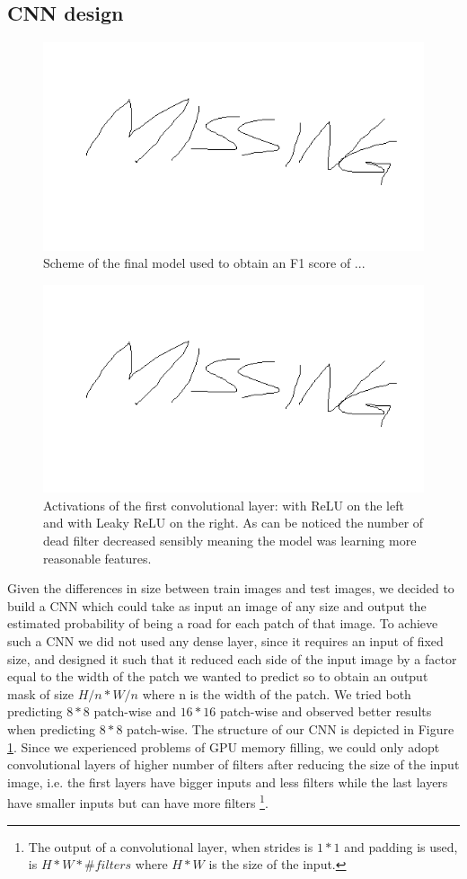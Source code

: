 \documentclass[10pt,conference,compsocconf]{IEEEtran}
\begin{document}
\subsection{CNN design}
\begin{figure}[tbp]
	\centering
	\includegraphics[width=0.8\columnwidth]{img/missing.png}
	\caption{Scheme of the final model used to obtain an F1 score of ... }
	\vspace{-3mm}
	\label{fig:cnn-model}
\end{figure}
\begin{figure}[tbp]
	\centering
	\includegraphics[width=0.8\columnwidth]{img/missing.png}
	\caption{Activations of the first convolutional layer: with ReLU on the left and with Leaky ReLU on the right. As can be noticed the number of dead filter decreased sensibly meaning the model was learning more reasonable features.}
	\vspace{-3mm}
	\label{fig:dead-filters}
\end{figure}
Given the differences in size between train images and test images, we decided to build a CNN which could take as input an image of any size and output the estimated probability of being a road for each patch of that image. To achieve such a CNN we did not used any dense layer, since it requires an input of fixed size, and designed it such that it reduced each side of the input image by a factor equal to the width of the patch we wanted to predict so to obtain an output mask of size $H/n*W/n$ where n is the width of the patch. We tried both predicting $8*8$ patch-wise and $16*16$ patch-wise and observed better results when predicting $8*8$ patch-wise. The structure of our CNN is depicted in Figure \ref{fig:cnn-model}. Since we experienced problems of GPU memory filling, we could only adopt convolutional layers of higher number of filters after reducing the size of the input image, i.e. the first layers have bigger inputs and less filters while the last layers have smaller inputs but can have more filters \footnote{The output of a convolutional layer, when strides is $1*1$ and padding is used, is $H * W * \#filters$ where $H*W$ is the size of the input.}. 
\end{document}
